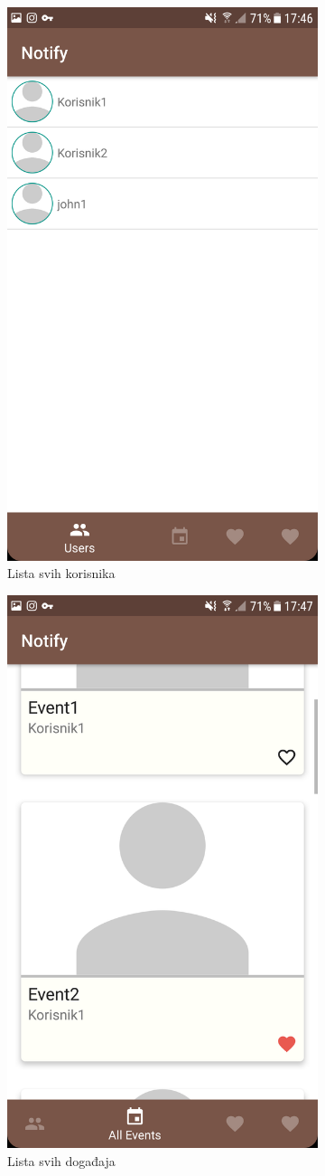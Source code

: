 \documentclass[times, utf8, zavrsni]{fer}
\begin{document}
{\begin{figure}
\begin{subfigure}{0.5\linewidth}
	\centering
    \includegraphics[width=0.45\linewidth]{img/ss-user-list.png} 
    \caption{Lista svih korisnika}
    \label{fig:user-list-image}
\end{subfigure}%
\begin{subfigure}{0.5\linewidth}
 	\centering
    \includegraphics[width=0.45\linewidth]{img/ss-event-list-all.png} 
    \caption{Lista svih događaja}
    \label{fig:event-list-all-image}
\end{subfigure}
\begin{subfigure}{0.5\linewidth}

\end{subfigure}
\end{figure}}
\end{document}
